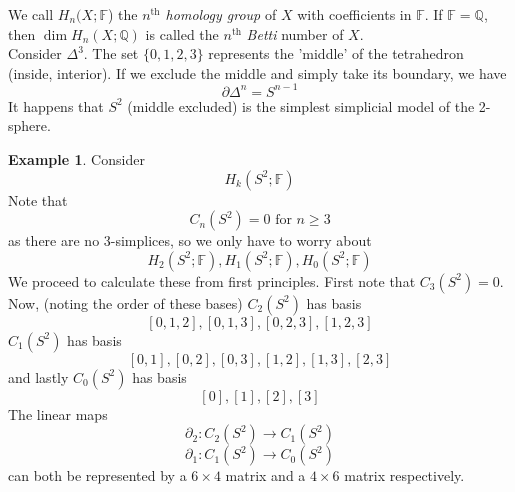 \documentclass[a4paper,14pt]{extarticle}
\theoremstyle{definition}
\newtheorem*{eg}{Example}
\begin{document}
We call $H_n(X;\mathbb{F}$) the \emph{$n^{\text{th}}$ homology group} of $X$ with coefficients in $\mathbb{F}$. If $\mathbb{F}=\mathbb{Q}$, then $\dim H_n(X;\mathbb{Q})$ is called
the $n^{\text{th}}$ \emph{Betti} number of $X$. \\

Consider $\Delta^3$. The set $\{0,1,2,3\}$ represents the 'middle' of the tetrahedron (inside, interior). If we exclude the middle and simply take its boundary, we have \[\partial\Delta^n=S^{n-1}\]
It happens that $S^2$ (middle excluded) is the simplest simplicial model of the 2-sphere.

\begin{eg}
Consider \[H_k(S^2;\mathbb{F})\] Note that \[C_n(S^2)=0\text{ for }n\geq3\] as there are no 3-simplices, so we only have to worry about
\[H_2(S^2;\mathbb{F}),H_1(S^2;\mathbb{F}),H_0(S^2;\mathbb{F})\] We proceed to calculate these from first principles. First note that $C_3(S^2)=0$. Now, (noting the order of these bases)
 $C_2(S^2)$ has basis
\[[0,1,2],[0,1,3],[0,2,3],[1,2,3]\] $C_1(S^2)$ has basis \[[0,1],[0,2],[0,3],[1,2],[1,3],[2,3]\] and lastly $C_0(S^2)$ has basis \[[0],[1],[2],[3]\]
The linear maps \[\partial_2:C_2(S^2)\rightarrow C_1(S^2)\]\[\partial_1:C_1(S^2)\rightarrow C_0(S^2)\] can both be represented by a $6\times4$ matrix and a $4\times6$ matrix respectively.


\end{eg}
\end{document}
